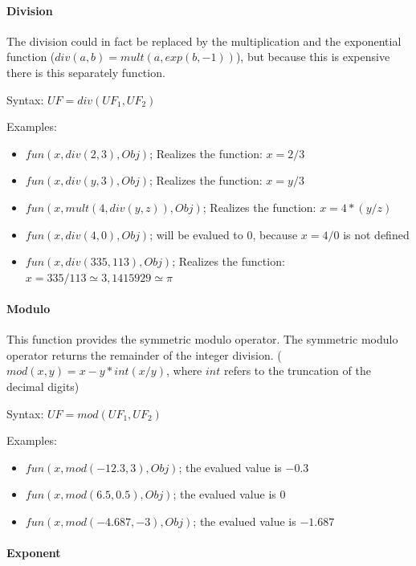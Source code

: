 \paragraph{Division}

The division could in fact be replaced by the multiplication and the exponential function ($div(a,b)=mult( a, exp(b,-1) )$), but because this is expensive there is this separately function.

\bigskip\noindent
Syntax:
$UF=div( UF_1, UF_2 )$

\bigskip\noindent
Examples:
\begin{itemize}
 \item $fun(x, div( 2, 3 ), Obj)$; Realizes the function: $x=2/3$
 \item $fun(x, div( y, 3 ), Obj)$; Realizes the function: $x=y/3$
 \item $fun(x, mult( 4, div( y, z ) ), Obj)$; Realizes the function: $x=4*(y/z)$
 \item $fun(x, div( 4, 0 ), Obj)$; will be evalued to $0$, because $x=4/0$ is not defined
 \item $fun(x, div( 335, 113 ), Obj)$; Realizes the function: $x=335/113 \simeq 3,1415929 \simeq \pi$
\end{itemize}


\paragraph{Modulo}

This function provides the symmetric modulo operator. The symmetric modulo operator returns the remainder of the integer division.
( $mod(x, y) = x - y * int (x / y)$, where $int$ refers to the truncation of the decimal digits)

\bigskip\noindent
Syntax:
$UF=mod( UF_1, UF_2 )$

\bigskip\noindent
Examples:
\begin{itemize}
 \item $fun(x, mod( -12.3, 3 ), Obj)$; the evalued value is $-0.3$
 \item $fun(x, mod( 6.5, 0.5 ), Obj)$; the evalued value is $0$
 \item $fun(x, mod( -4.687, -3 ), Obj)$; the evalued value is $-1.687$
\end{itemize}


\paragraph{Exponent}

